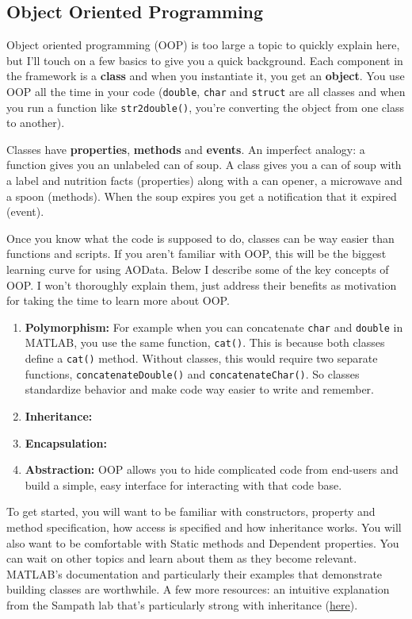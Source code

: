 \documentclass[10pt]{exam}
\newcommand\myurl[1]{\textcolor{blue}{\underline{#1}}}
\newcommand\aodclass[1]{\textcolor{codeblue}{\texttt{#1}}}
\newcommand\aodfcn[1]{\textcolor{darkteal}{\texttt{#1}}}
\begin{document}
	\subsection{Object Oriented Programming}
		\label{subsection:OOP}
		\noindent Object oriented programming (OOP) is too large a topic to quickly explain here, but I'll touch on a few basics to give you a quick background. Each component in the framework is a \textbf{class} and when you instantiate it, you get an \textbf{object}. You use OOP all the time in your code (\aodclass{double}, \aodclass{char} and \aodclass{struct} are all classes and when you run a function like \aodfcn{str2double()}, you're converting the object from one class to another). 
		
		Classes have \textbf{properties}, \textbf{methods} and \textbf{events}. An imperfect analogy: a function gives you an unlabeled can of soup. A class gives you a can of soup with a label and nutrition facts (properties) along with a can opener, a microwave and a spoon (methods). When the soup expires you get a notification that it expired (event). 
		
		Once you know what the code is supposed to do, classes can be way easier than functions and scripts. If you aren't familiar with OOP, this will be the biggest learning curve for using AOData. Below I describe some of the key concepts of OOP. I won't thoroughly explain them, just address their benefits as motivation for taking the time to learn more about OOP.
		\begin{enumerate}
			\item \textbf{Polymorphism:} For example when you can concatenate \aodclass{char} and \aodclass{double} in MATLAB, you use the same function, \aodfcn{cat()}. This is because both classes define a \aodfcn{cat()} method. Without classes, this would require two separate functions, \aodfcn{concatenateDouble()} and \aodfcn{concatenateChar()}. So classes standardize behavior and make code way easier to write and remember. %
			\item \textbf{Inheritance:}
			\item \textbf{Encapsulation:}
			\item \textbf{Abstraction:} OOP allows you to hide complicated code from end-users and build a simple, easy interface for interacting with that code base. 
		\end{enumerate}
		
		To get started, you will want to be familiar with constructors, property and method specification, how access is specified and how inheritance works. You will also want to be comfortable with Static methods and Dependent properties. You can wait on other topics and learn about them as they become relevant. 
		MATLAB's documentation and particularly their examples that demonstrate building classes are worthwhile. A few more resources: an intuitive explanation from the Sampath lab that's particularly strong with inheritance (\myurl{\href{https://github.com/sampath-lab-ucla/MATLAB_Resources/blob/master/Introduction_08_OOP.m}{here}}). 
		
\end{document}

